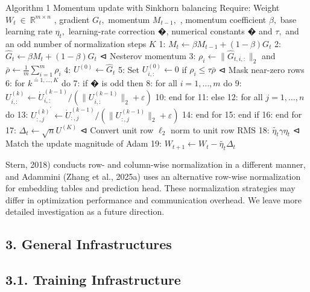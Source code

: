 \documentclass[
  10
]{article}
\begin{document}
Algorithm 1 Momentum update with Sinkhorn balancing Require: Weight
\(W _ { t } \ \in \ \mathbb { R } ^ { m \times n }\) , gradient
\(G _ { t } ,\) momentum \(M _ { t - 1 } ,\) , momentum coefficient
\(\beta ,\) base learning rate \(\eta _ { t } ,\) learning-rate
correction �, numerical constants � and \(\tau ,\) and an odd number of
normalization steps \(K\) 1:
\(M _ { t } \gets \beta M _ { t - 1 } + ( 1 - \beta ) G _ { t }\) 2:
\(\widehat { G } _ { t } \gets \beta M _ { t } + ( 1 - \beta ) G _ { t }\)
⊲ Nesterov momentum 3:
\(\rho _ { i } \gets \| \widehat { G } _ { t , i , : } \| _ { 2 }\) and
\(\textstyle { \bar { \rho } } \gets { \frac { 1 } { m } } \sum _ { i = 1 } ^ { m } \rho _ { i }\)
4: \(U ^ { ( 0 ) } \gets \widehat { G } _ { t }\) 5: Set
\(U _ { i , : } ^ { ( 0 ) } \gets 0\) if
\(\rho _ { i } \leqslant \tau \bar { \rho }\) ⊲ Mask near-zero rows 6:
for \(k ^ { \stackrel { \prime } { = } 1 , \ldots , K }\) do 7: if � is
odd then 8: for all \(i = 1 , \ldots , m\) do 9:
\(U _ { i , : } ^ { ( k ) } \gets \dot { U } _ { i , : } ^ { ( k - 1 ) } / ( \| U _ { i , : } ^ { ( k - 1 ) } \| _ { 2 } + \varepsilon )\)
10: end for 11: else 12: for all \(j = 1 , \dotsc , n\) do 13:
\(U _ { : , j } ^ { ( k ) ^ { \prime } } \gets \dot { U } _ { : , j } ^ { ( k - 1 ) } / ( \lVert U _ { : , j } ^ { ( k - 1 ) } \rVert _ { 2 } + \varepsilon )\)
14: end for 15: end if 16: end for 17:
\(\Delta _ { t } \gets \sqrt { n } U ^ { ( K ) }\) ⊲ Convert unit row
\(\ell _ { 2 }\) norm to unit row RMS 18:
\(\widetilde { \eta _ { t } }  \gamma \eta _ { t }\) ⊲ Match the update
magnitude of Adam 19:
\(W _ { t + 1 } \gets W _ { t } - \widetilde { \eta _ { t } } \Delta _ { t }\)

Stern, 2018) conducts row- and column-wise normalization in a different
manner, and Adammini (Zhang et al., 2025a) uses an alternative row-wise
normalization for embedding tables and prediction head. These
normalization strategies may differ in optimization performance and
communication overhead. We leave more detailed investigation as a future
direction.

\subsection{3. General Infrastructures}\label{general-infrastructures}

\subsection{3.1. Training Infrastructure}\label{training-infrastructure}
\end{document}
